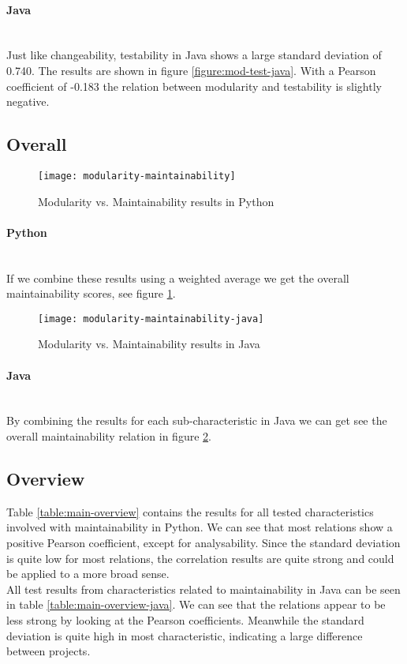 \documentclass[twoside]{uva-inf-bachelor-thesis}
\newcommand{\myparagraph}[1]{\paragraph{#1}\mbox{}\\}
\begin{document}
\myparagraph{Java}
Just like changeability, testability in Java shows a large standard deviation of 0.740. The results are shown in figure \ref{figure:mod-test-java}. With a Pearson coefficient of -0.183 the relation between modularity and testability is slightly negative.

\subsection{Overall}
\begin{figure}[H]
    \caption{Modularity vs. Maintainability results in Python}
    \label{figure:mod-main}
    \centering
        \texttt{[image: modularity-maintainability]}
\end{figure}

\myparagraph{Python}
If we combine these results using a weighted average we get the overall maintainability scores, see figure \ref{figure:mod-main}.

\begin{figure}[H]
    \caption{Modularity vs. Maintainability results in Java}
    \label{figure:mod-main-java}
    \centering
        \texttt{[image: modularity-maintainability-java]}
\end{figure}

\myparagraph{Java}
By combining the results for each sub-characteristic in Java we can get see the overall maintainability relation in figure \ref{figure:mod-main-java}.

\subsection{Overview}
Table \ref{table:main-overview} contains the results for all tested characteristics involved with maintainability in Python. We can see that most relations show a positive Pearson coefficient, except for analysability. Since the standard deviation is quite low for most relations, the correlation results are quite strong and could be applied to a more broad sense.\\

All test results from characteristics related to maintainability in Java can be seen in table \ref{table:main-overview-java}. We can see that the relations appear to be less strong by looking at the Pearson coefficients. Meanwhile the standard deviation is quite high in most characteristic, indicating a large difference between projects.
\end{document}

